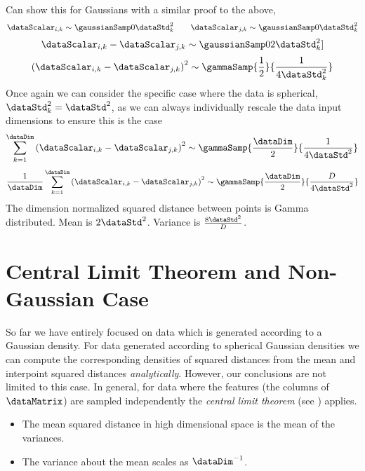  Can show this for Gaussians with a similar proof to the above,
\[
\dataScalar_{i,k}\sim\gaussianSamp 0{\dataStd_{k}^{2}}\quad\quad\dataScalar_{j,k}\sim\gaussianSamp 0{\dataStd_{k}^{2}}
\]
\[
\dataScalar_{i,k}-\dataScalar_{j,k}\sim\gaussianSamp 0{2\dataStd_{k}^{2}}]
\]
\[
\left(\dataScalar_{i,k}-\dataScalar_{j,k}\right)^{2}\sim\gammaSamp{\frac{1}{2}}{\frac{1}{4\dataStd_{k}^{2}}}
\]
Once again we can consider the specific case where the data is
spherical, $\dataStd_{k}^{2}=\dataStd^{2}$, as we can always
individually rescale the data input dimensions to ensure this is the
case
\[
\sum_{k=1}^{\dataDim}\left(\dataScalar_{i,k}-\dataScalar_{j,k}\right)^{2}\sim\gammaSamp{\frac{\dataDim}{2}}{\frac{1}{4\dataStd^{2}}}
\]
\[
\frac{1}{\dataDim}\sum_{k=1}^{\dataDim}\left(\dataScalar_{i,k}-\dataScalar_{j,k}\right)^{2}\sim\gammaSamp{\frac{\dataDim}{2}}{\frac{D}{4\dataStd^{2}}}
\]
The dimension normalized squared distance between points is Gamma
distributed.  Mean is $2\dataStd^{2}$. Variance is
$\frac{8\dataStd^{2}}{D}$.



\section{Central Limit Theorem and Non-Gaussian Case}

So far we have entirely focused on data which is generated according
to a Gaussian density. For data generated according to spherical
Gaussian densities we can compute the corresponding densities of
squared distances from the mean and interpoint squared distances
\emph{analytically}. However, our conclusions are not limited to this
case. In general, for data where the features (the columns of
$\dataMatrix$) are sampled independently the \emph{central limit
  theorem} (see )
applies.  

\begin{itemize}
\item The mean squared distance in high dimensional space is the mean
  of the variances.
\item The variance about the mean scales as $\dataDim^{-1}$.
\end{itemize}



